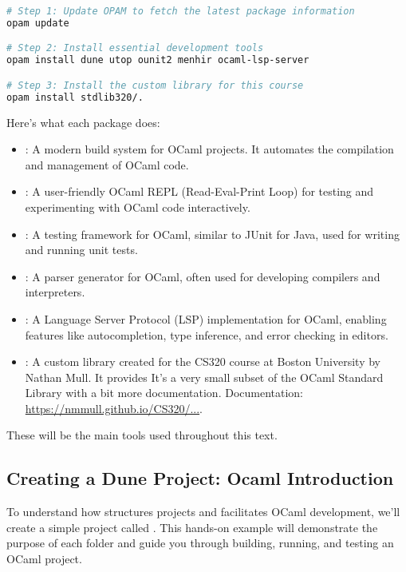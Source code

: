 \begin{lstlisting}[language=Bash, caption={Updating OPAM and Installing Packages}]
# Step 1: Update OPAM to fetch the latest package information
opam update

# Step 2: Install essential development tools
opam install dune utop ounit2 menhir ocaml-lsp-server

# Step 3: Install the custom library for this course
opam install stdlib320/.
\end{lstlisting}

\noindent
Here's what each package does:
\begin{itemize}
	\item {}: A modern build system for OCaml projects. It automates the compilation and management of OCaml code.
	\item {}: A user-friendly OCaml REPL (Read-Eval-Print Loop) for testing and experimenting with OCaml code interactively.
	\item {}: A testing framework for OCaml, similar to JUnit for Java, used for writing and running unit tests.
	\item {}: A parser generator for OCaml, often used for developing compilers and interpreters.
	\item {}: A Language Server Protocol (LSP) implementation for OCaml, enabling features like autocompletion, type inference, and error checking in editors.
	\item {}: A custom library created for the CS320 course at Boston University by Nathan Mull. It provides
	      It's a very small subset of the OCaml Standard Library with a bit more documentation. Documentation: \href{https://nmmull.github.io/CS320/landing/Spring-2025/Specifications/Stdlib320/index.html}{https://nmmull.github.io/CS320/...}.
\end{itemize}

\noindent
These will be the main tools used throughout this text.

\subsection{Creating a Dune Project: Ocaml Introduction}

To understand how  structures projects and facilitates OCaml development, we'll create a simple project called .
This hands-on example will demonstrate the purpose of each folder and guide you through building, running, and testing an OCaml project.

